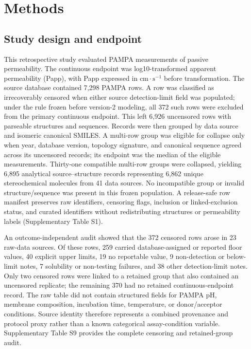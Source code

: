 \documentclass[referee,lineno,pdflatex,sn-vancouver-num]{sn-jnl}
\begin{document}
\section{Methods}

\subsection{Study design and endpoint}

This retrospective study evaluated PAMPA measurements of passive permeability. The continuous endpoint was log10-transformed apparent permeability (Papp), with Papp expressed in $\mathrm{cm}\cdot\mathrm{s}^{-1}$ before transformation. The source database contained 7,298 PAMPA rows. A row was classified as irrecoverably censored when either source detection-limit field was populated; under the rule frozen before version-2 modeling, all 372 such rows were excluded from the primary continuous endpoint. This left 6,926 uncensored rows with parseable structures and sequences. Records were then grouped by data source and isomeric canonical SMILES. A multi-row group was eligible for collapse only when year, database version, topology signature, and canonical sequence agreed across its uncensored records; its endpoint was the median of the eligible measurements. Thirty-one compatible multi-row groups were collapsed, yielding 6,895 analytical source--structure records representing 6,862 unique stereochemical molecules from 41 data sources. No incompatible group or invalid structure/sequence was present in this frozen population. A release-safe row manifest preserves raw identifiers, censoring flags, inclusion or linked-exclusion status, and curated identifiers without redistributing structures or permeability labels (Supplementary Table S1).

An outcome-independent audit showed that the 372 censored rows arose in 23 raw-data sources. Of these rows, 259 carried database-assigned or reported floor values, 40 explicit upper limits, 19 no reportable value, 9 non-detection or below-limit notes, 7 solubility or non-testing failures, and 38 other detection-limit notes. Only two censored rows were linked to a retained group that also contained an uncensored replicate; the remaining 370 had no retained continuous-endpoint record. The raw table did not contain structured fields for PAMPA pH, membrane composition, incubation time, temperature, or donor/acceptor conditions. Source identity therefore represents a combined provenance and protocol proxy rather than a known categorical assay-condition variable. Supplementary Table S9 provides the complete censoring and retained-group audit.
\end{document}
